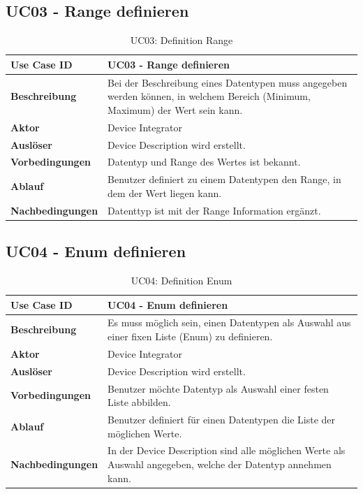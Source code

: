 \subsection{UC03 - Range definieren}

\begin{table}[H]
\begin{tabularx}{\textwidth}{|l|X|}

 \hline
 {\bf Use Case ID }    & UC03 - Range definieren \\  \hline
 {\bf Beschreibung }   & Bei der Beschreibung eines Datentypen muss angegeben werden können, in welchem Bereich (Minimum, Maximum) der Wert sein kann. \\ \hline
 {\bf Aktor }          & Device Integrator \\ \hline
 {\bf Auslöser }       & Device Description wird erstellt. \\ \hline
 {\bf Vorbedingungen } & Datentyp und Range des Wertes ist bekannt. \\ \hline
 {\bf Ablauf }         & Benutzer definiert zu einem Datentypen den Range, in dem der Wert liegen kann. \\ \hline
 {\bf Nachbedingungen} & Datenttyp ist mit der Range Information ergänzt. \\ \hline
  
\end{tabularx}
\caption{UC03: Definition Range}
\end{table}

\subsection{UC04 - Enum definieren}
\begin{table}[H]
\begin{tabularx}{\textwidth}{|l|X|}

 \hline
 {\bf Use Case ID }    & UC04 - Enum definieren \\  \hline
 {\bf Beschreibung }   & Es muss möglich sein, einen Datentypen als Auswahl aus einer fixen Liste (Enum) zu definieren. \\ \hline
 {\bf Aktor }          & Device Integrator \\ \hline
 {\bf Auslöser }       & Device Description wird erstellt. \\ \hline
 {\bf Vorbedingungen } & Benutzer möchte Datentyp als Auswahl einer festen Liste abbilden. \\ \hline
 {\bf Ablauf }         & Benutzer definiert für einen Datentypen die Liste der möglichen Werte. \\ \hline
 {\bf Nachbedingungen} & In der Device Description sind alle möglichen Werte als Auswahl angegeben, welche der Datentyp annehmen kann.\\ \hline
  
\end{tabularx}
\caption{UC04: Definition Enum}
\end{table}

